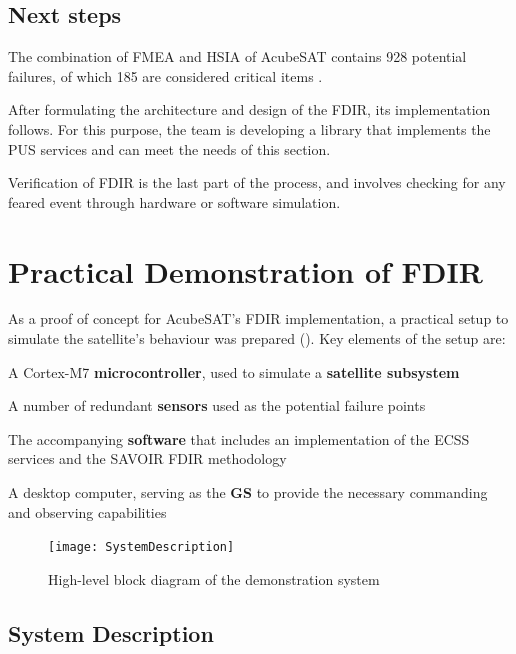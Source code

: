 \documentclass[a4paper,nobib,final]{tufte-book}
\begin{document}
\section{Next steps}
The combination of \acs{FMEA} and \acs{HSIA} of AcubeSAT contains 928 potential failures, of which 185 are considered critical items \autocite{retselis_acubesat_fmea_2020}.

After formulating the architecture and design of the \acs{FDIR}, its implementation follows. For this purpose, the team is developing a library that implements the \acs{PUS} services and can meet the needs of this section.

Verification of \acs{FDIR} is the last part of the process, and involves checking for any feared event through hardware or software simulation.

\chapter{Practical Demonstration of \acs{FDIR}}
\label{cap:practical}

As a proof of concept for AcubeSAT's \ac{FDIR} implementation, a practical setup to simulate the satellite's behaviour was prepared (). Key elements of the setup are:
\begin{compactitem}
	\item A Cortex-M7 \textbf{microcontroller}, used to simulate a \textbf{satellite subsystem}
	\item A number of redundant \textbf{sensors} used as the potential failure points
	\item The accompanying \textbf{software} that includes an implementation of the \acs{ECSS} services and the \acs{SAVOIR} \acs{FDIR} methodology
	\item A desktop computer, serving as the \textbf{\acl{GS}} to provide the necessary commanding and observing capabilities
\end{compactitem}

\begin{figure}[h]
	\texttt{[image: SystemDescription]}
	\caption{High-level block diagram of the demonstration system}
	\label{fig:block}
\end{figure}

\pagebreak[4]
\section{System Description}
\end{document}
